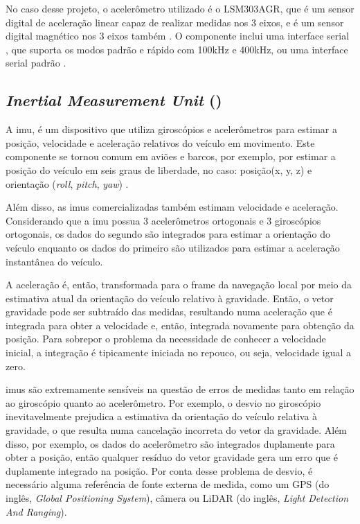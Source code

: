 \documentclass[acronym, symbols, table]{fei}
\begin{document}
				No caso desse projeto, o acelerômetro utilizado é o LSM303AGR, que é um sensor digital de aceleração linear capaz de realizar medidas nos 3 eixos, e é um sensor digital magnético nos 3 eixos também \cite{datasheet_accel}. O componente inclui uma interface serial , que suporta os modos padrão e rápido com 100kHz e 400kHz, ou uma interface serial padrão .
				
			\subsection{\textit{Inertial Measurement Unit} ()}
			
				A \acrshort{imu}, é um dispositivo que utiliza giroscópios e acelerômetros para estimar a posição, velocidade e aceleração relativos do veículo em movimento. Este componente se tornou comum em aviões e barcos, por exemplo, por estimar a posição do veículo em seis graus de liberdade, no caso: posição(x, y, z) e orientação (\textit{roll}, \textit{pitch}, \textit{yaw}) \cite{siegwart2011introduction}.
				
				Além disso, as \acrshort{imu}s comercializadas também estimam velocidade e aceleração. Considerando que a \acrshort{imu} possua 3 acelerômetros ortogonais e 3 giroscópios ortogonais, os dados do segundo são integrados para estimar a orientação do veículo enquanto os dados do primeiro são utilizados para estimar a aceleração instantânea do veículo.
				
				A aceleração é, então, transformada para o frame da navegação local por meio da estimativa atual da orientação do veículo relativo à gravidade. Então, o vetor gravidade pode ser subtraído das medidas, resultando numa aceleração que é integrada para obter a velocidade e, então, integrada novamente para obtenção da posição. Para sobrepor o problema da necessidade de conhecer a velocidade inicial, a integração é tipicamente iniciada no repouco, ou seja, velocidade igual a zero.
				
				\acrshort{imu}s são extremamente sensíveis na questão de erros de medidas tanto em relação ao giroscópio quanto ao acelerômetro. Por exemplo, o desvio no giroscópio inevitavelmente prejudica a estimativa da orientação do veículo relativa à gravidade, o que resulta numa cancelação incorreta do vetor da gravidade. Além disso, por exemplo, os dados do acelerômetro são integrados duplamente para obter a posição, então qualquer resíduo do vetor gravidade gera um erro que é duplamente integrado na posição. Por conta desse problema de desvio, é necessário alguma referência de fonte externa de medida, como um GPS (do inglês, \textit{Global Positioning System}), câmera ou LiDAR (do inglês, \textit{Light Detection And Ranging}).
		
\end{document}
